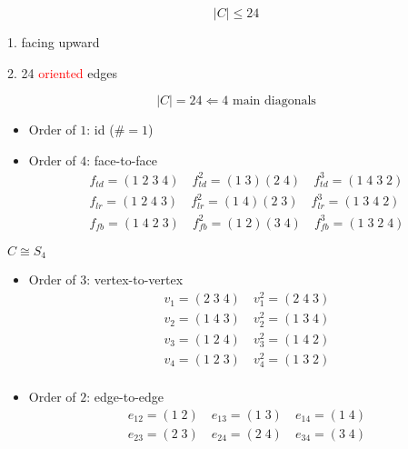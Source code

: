 
\begin{frame}{}

  \[
    |C| \le 24
  \]

  \pause
  \vspace{0.6cm}
  \centerline{1. facing upward}

  \vspace{0.4cm}
  \centerline{2. 24 \textcolor{red}{oriented} edges}

  \pause
  \[
    |C| = 24 \Leftarrow 4 \text{ main diagonals}
  \]
\end{frame}
\begin{frame}{}
  \begin{itemize}
    \item Order of $1$: id ($\# = 1$)
    \item Order of $4$: face-to-face
      \begin{align*} 
		f_{td} = (1\;2\;3\;4) \quad f_{td}^{2} = (1\;3) (2\;4)  \quad f_{td}^{3} = (1\;4\;3\;2) \\
		f_{lr} = (1\;2\;4\;3) \quad f_{lr}^{2} = (1\;4) (2\;3)  \quad f_{lr}^{3} = (1\;3\;4\;2) \\
		f_{fb} = (1\;4\;2\;3) \quad f_{fb}^{2} = (1\;2) (3\;4)  \quad f_{fb}^{3} = (1\;3\;2\;4)
      \end{align*}
  \end{itemize}
\end{frame}
\begin{frame}{$C \cong S_4$}
  \begin{itemize}
    \item Order of $3$: vertex-to-vertex
      \begin{align*}
        v_{1} = (2\;3\;4) \quad v_{1}^{2} = (2\;4\;3) \\
        v_{2} = (1\;4\;3) \quad v_{2}^{2} = (1\;3\;4) \\
        v_{3} = (1\;2\;4) \quad v_{3}^{2} = (1\;4\;2) \\
        v_{4} = (1\;2\;3) \quad v_{4}^{2} = (1\;3\;2) \\
      \end{align*}
    \item Order of $2$: edge-to-edge
      \begin{align*}
        e_{12} = (1\;2) \quad e_{13} = (1\;3) \quad e_{14} = (1\;4) \\
        e_{23} = (2\;3) \quad e_{24} = (2\;4) \quad e_{34} = (3\;4)
      \end{align*}
  \end{itemize}
\end{frame}
